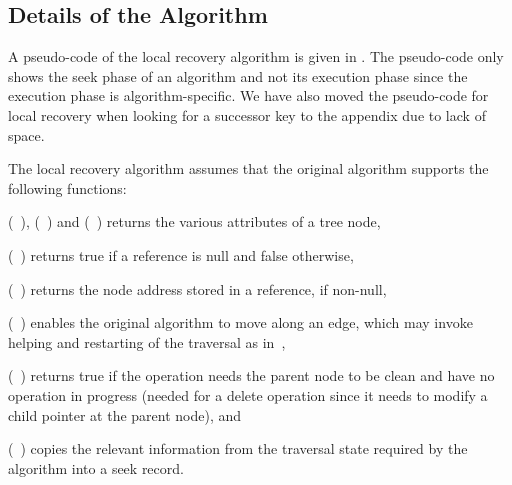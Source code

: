 \subsection{Details of the Algorithm}
\label{sec:description}



A pseudo-code of the local recovery algorithm is given in . The pseudo-code only shows the seek phase of an algorithm and not its execution phase since the execution phase is algorithm-specific. We have also moved the pseudo-code for local recovery when looking for a successor key to the appendix due to lack of space.


The local recovery algorithm assumes that the original algorithm supports the following functions:
\begin{enumerate*}[label=(\alph*)]
\item \GetKey(~), \IsMarked(~) and \GetChild(~) returns the various attributes of a tree node,
\item \IsNull(~) returns true if a reference is null and false otherwise,
\item \GetAddress(~) returns the node address stored in a reference, if non-null,
\item \Move(~) enables the original algorithm to move along an edge, which may invoke helping and restarting of the traversal as in~\cite{HowJon:2012:SPAA},
\item \NeedCleanParentNode(~) returns true if the operation needs the parent node to be clean and have no operation in progress (needed for a delete operation since it needs to modify a child pointer at the parent node), and
\item \PopulateSeekRecord(~) copies the relevant information from the traversal state required by the algorithm into a seek record.
\end{enumerate*}

\begin{comment}
\NeedSuccessorKey(~) evaluates if the successor key is still needed for the target key and returns a reference which is null if no successor key is needed and an address of the terminal node's right child otherwise
\end{comment}

